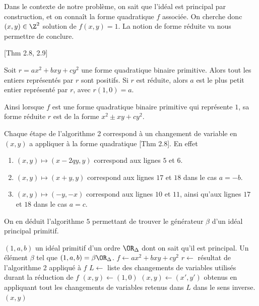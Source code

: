 Dans le contexte de notre problème, on sait que l'idéal est principal par construction, et on connaît la forme quadratique $f$ associée. On cherche donc $(x,y)\in\Z^2$ solution de $f(x,y) = 1$. La notion de forme réduite va nous permettre de conclure. 

\begin{Prop}\cite{Cox}[Thm 2.8, 2.9]
	
	Soit $r = ax^2 + bxy + cy^2$ une forme quadratique binaire primitive. Alors tout les entiers représentés par $r$ sont positifs. Si $r$ est réduite, alors $a$ est le plus petit entier représenté par $r$, avec $r(1,0) = a$.
\end{Prop}

Ainsi lorsque $f$ est une forme quadratique binaire primitive qui représente $1$, sa forme réduite $r$ est de la forme $x^2 \pm xy + cy^2$. 

\begin{Rem}
	Chaque étape de l'algorithme 2 correspond à un changement de variable en $(x,y)$ a appliquer à la forme quadratique \cite{Cox}[Thm 2.8]. En effet
	\begin{enumerate}
		\item $(x,y)\mapsto (x - 2qy, y)$ correspond aux lignes $5$ et $6$.
		\item $(x,y)\mapsto (x + y, y)$ correspond aux lignes $17$ et $18$ dans le cas $a = -b$.
		\item $(x,y)\mapsto(-y,-x)$ correspond aux lignes $10$ et $11$, ainsi qu'aux lignes $17$ et $18$ dans le cas $a = c$. 
	\end{enumerate}
\end{Rem}


On en déduit l'algorithme $5$ permettant de trouver le générateur $\beta$ d'un idéal principal primitif.

\begin{algorithm}
	\caption{Générateur d'un idéal principal primitif donné sous forme standard}
	\begin{algorithmic}[1]
		\Require $(1,a,b)$ un idéal primitif d'un ordre $\OR_{\Delta}$ dont on sait qu'il est principal.
		\Ensure Un élément $\beta$ tel que $(1,a,b) = \beta\OR_{\Delta}$. 
		\State $f\gets ax^2 + bxy + cy^2$
		\State $r\gets$ résultat de l'algorithme 2 appliqué à $f$
		\State $L\gets$ liste des changements de variables utilisés durant la réduction de $f$
		\State $(x,y)\gets(1,0)$
		\State $(x,y)\gets(x',y')$ obtenus en appliquant tout les changements de variables retenus dans $L$ dans le sens inverse.
		\State \Return $(x,y)$
	\end{algorithmic}
\end{algorithm}



